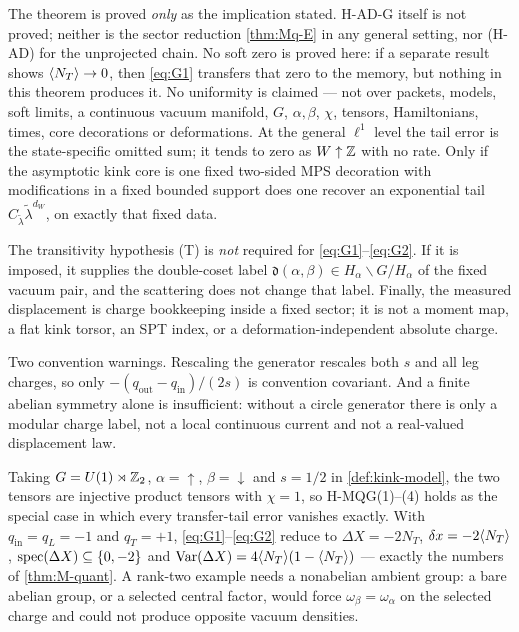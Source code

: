 \begin{scope}
\label{scope:M-quant-G}
The theorem is proved \emph{only} as the implication stated. H-AD-G itself is
not proved; neither is the sector reduction \cref{thm:Mq-E} in any general
setting, nor (H-AD) for the unprojected chain. No soft zero is proved here: if
a separate result shows $\langle N_T\rangle\to0$, then \eqref{eq:G1} transfers that
zero to the memory, but nothing in this theorem produces it. No uniformity is
claimed --- not over packets, models, soft limits, a continuous vacuum
manifold, $G$, $\alpha,\beta$, $\chi$, tensors, Hamiltonians, times, core
decorations or deformations. At the general $\ell^1$ level the tail error is
the state-specific omitted sum; it tends to zero as $W\uparrow\mathbb{Z}$ with no rate.
Only if the asymptotic kink core is one fixed two-sided MPS decoration with
modifications in a fixed bounded support does one recover an exponential tail
$C_{\tilde\lambda}\tilde\lambda^{d_W}$, on exactly that fixed data.

The transitivity hypothesis (T) is \emph{not} required for
\eqref{eq:G1}--\eqref{eq:G2}. If it is imposed, it supplies the double-coset
label $\mathfrak d(\alpha,\beta)\in H_\alpha\backslash G/H_\alpha$ of the fixed
vacuum pair, and the scattering does not change that label. Finally, the
measured displacement is charge bookkeeping inside a fixed sector; it is not a
moment map, a flat kink torsor, an SPT index, or a deformation-independent
absolute charge.

Two convention warnings. Rescaling the generator rescales both $s$ and all leg
charges, so only $-(q_{\mathrm{out}}-q_{\mathrm{in}})/(2s)$ is convention
covariant. And a finite abelian symmetry alone is insufficient: without a
circle generator there is only a modular charge label, not a local continuous
current and not a real-valued displacement law.
\end{scope}

\begin{remark}
\label{rem:G-instantiation}
Taking $G=U(1)\rtimes\mathbb{Z}_2$, $\alpha=\uparrow$, $\beta=\downarrow$ and $s=1/2$
in \cref{def:kink-model}, the two tensors are injective product tensors with
$\chi=1$, so H-MQG(1)--(4) holds as the special case in which every
transfer-tail error vanishes exactly. With $q_{\mathrm{in}}=q_L=-1$ and
$q_T=+1$, \eqref{eq:G1}--\eqref{eq:G2} reduce to $\Delta X=-2N_T$,
$\delta x=-2\langle N_T\rangle$, $\operatorname{spec}(\Delta X)\subseteq\{0,-2\}$ and
$\operatorname{Var}(\Delta X)=4\langle N_T\rangle(1-\langle N_T\rangle)$ --- exactly the
numbers of \cref{thm:M-quant}. A rank-two example needs a nonabelian ambient
group: a bare abelian group, or a selected central factor, would force
$\omega_\beta=\omega_\alpha$ on the selected charge and could not produce
opposite vacuum densities.
\end{remark}

